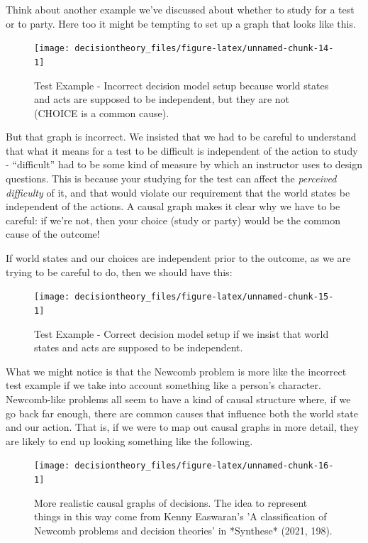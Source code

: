 \documentclass[]{tufte-book}
\begin{document}
Think about another example we've discussed about whether to study for a test or to party. Here too it might be tempting to set up a graph that looks like this.

\begin{figure}
\texttt{[image: decisiontheory\_files/figure-latex/unnamed-chunk-14-1]} \caption[Test Example - Incorrect decision model setup because world states and acts are supposed to be independent, but they are not (CHOICE is a common cause)]{Test Example - Incorrect decision model setup because world states and acts are supposed to be independent, but they are not (CHOICE is a common cause).}\label{fig:unnamed-chunk-14}
\end{figure}

But that graph is incorrect. We insisted that we had to be careful to understand that what it means for a test to be difficult is independent of the action to study - ``difficult'' had to be some kind of measure by which an instructor uses to design questions. This is because your studying for the test can affect the \emph{perceived difficulty} of it, and that would violate our requirement that the world states be independent of the actions. A causal graph makes it clear why we have to be careful: if we're not, then your choice (study or party) would be the common cause of the outcome!

If world states and our choices are independent prior to the outcome, as we are trying to be careful to do, then we should have this:

\begin{figure}
\texttt{[image: decisiontheory\_files/figure-latex/unnamed-chunk-15-1]} \caption[Test Example - Correct decision model setup if we insist that world states and acts are supposed to be independent]{Test Example - Correct decision model setup if we insist that world states and acts are supposed to be independent.}\label{fig:unnamed-chunk-15}
\end{figure}

What we might notice is that the Newcomb problem is more like the incorrect test example if we take into account something like a person's character. Newcomb-like problems all seem to have a kind of causal structure where, if we go back far enough, there are common causes that influence both the world state and our action. That is, if we were to map out causal graphs in more detail, they are likely to end up looking something like the following.

\begin{figure}
\texttt{[image: decisiontheory\_files/figure-latex/unnamed-chunk-16-1]} \caption[More realistic causal graphs of decisions]{More realistic causal graphs of decisions. The idea to represent things in this way come from Kenny Easwaran's 'A classification of Newcomb problems and decision theories' in *Synthese* (2021, 198).}\label{fig:unnamed-chunk-16}
\end{figure}
\end{document}
